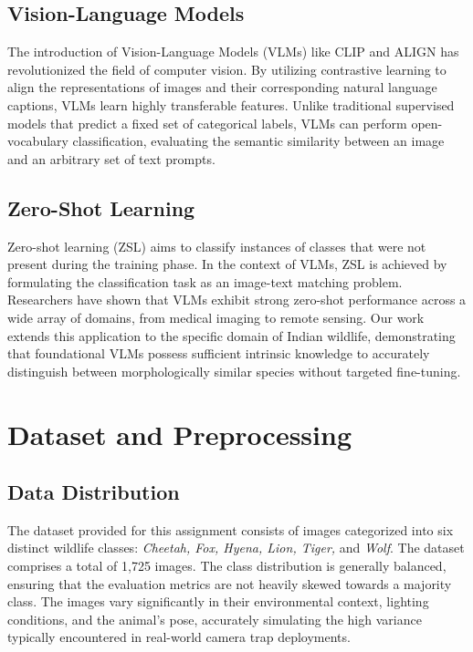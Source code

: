 \documentclass[11pt]{article}
\begin{document}
\subsection{Vision-Language Models}
The introduction of Vision-Language Models (VLMs) like CLIP \citep{radford2021learning} and ALIGN has revolutionized the field of computer vision. By utilizing contrastive learning to align the representations of images and their corresponding natural language captions, VLMs learn highly transferable features. Unlike traditional supervised models that predict a fixed set of categorical labels, VLMs can perform open-vocabulary classification, evaluating the semantic similarity between an image and an arbitrary set of text prompts.

\subsection{Zero-Shot Learning}
Zero-shot learning (ZSL) aims to classify instances of classes that were not present during the training phase. In the context of VLMs, ZSL is achieved by formulating the classification task as an image-text matching problem. Researchers have shown that VLMs exhibit strong zero-shot performance across a wide array of domains, from medical imaging to remote sensing. Our work extends this application to the specific domain of Indian wildlife, demonstrating that foundational VLMs possess sufficient intrinsic knowledge to accurately distinguish between morphologically similar species without targeted fine-tuning.

\section{Dataset and Preprocessing}

\subsection{Data Distribution}
The dataset provided for this assignment consists of images categorized into six distinct wildlife classes: \textit{Cheetah, Fox, Hyena, Lion, Tiger,} and \textit{Wolf}. The dataset comprises a total of 1,725 images. The class distribution is generally balanced, ensuring that the evaluation metrics are not heavily skewed towards a majority class. The images vary significantly in their environmental context, lighting conditions, and the animal's pose, accurately simulating the high variance typically encountered in real-world camera trap deployments.
\end{document}
